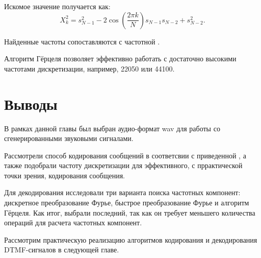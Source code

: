 Искомое значение получается как:
\begin{equation}
	X_{k}^{2}=s_{N-1}^{2}-2\cos \left({\frac {2\pi k}{N}}\right)s_{N-1}s_{N-2}+s_{N-2}^{2}.
\end{equation}	

Найденные частоты сопоставляются с частотной .

Алгоритм Гёрцеля позволяет эффективно работать с достаточно высокими частотами дискретизации, например, 22050 или 44100.

\section{Выводы} \label{ch1:conclusion}

В рамках данной главы был выбран аудио-формат wav для работы со сгенерированными звуковыми сигналами.

Рассмотрели способ кодирования сообщений в соответсвии с приведенной , а также подобрали частоту дискретизации для эффективного, с пррактической точки зрения, кодирования сообщения.

Для декодирования исследовали три варианта поиска частотных компонент: дискретное преобразование Фурье, быстрое преобразование Фурье и алгоритм Гёрцеля. Как итог, выбрали последний, так как он требует меньшего количества операций для расчета частотных компонент.

Рассмотрим практическую реализацию алгоритмов кодирования и декодирования DTMF-сигналов в следующей главе. 

%
\newpage %
